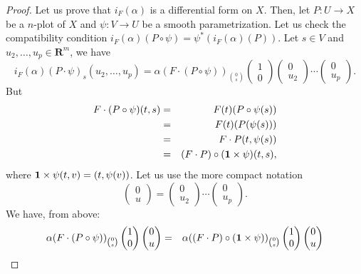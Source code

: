 \documentclass[11pt,reqno]{amsart}
\theoremstyle{definition}
\newcommand{\RR}{{\mathbf R}}
\def \F{{F}}
\def \P{{P}}
\def \U{{U}}
\def \V{{V}}
\def \X{{X}}
\newcommand{\id}{{\bf 1}}
\begin{document}
  \begin{proof}
    Let us prove that $i_\F(\alpha)$ is a differential form on $\X$.
    Then, let $\P : \U \to \X$ be a $n$-plot of $\X$ and $\psi: \V \to \U$ be
    a smooth parametrization. Let us check the compatibility condition  
    $i_\F(\alpha)(\P \circ \psi) = \psi^*(i_\F(\alpha)(\P))$. 
    Let $s \in
      \V$ and $u_2,\ldots,u_{p} \in \RR^m$, we have
    $$
      i_\F(\alpha)(\P\cdot\psi)_s(u_2,\ldots,u_{p}) =
      \alpha(\F \cdot (\P \circ \psi))_{0 \choose s}
      \begin{pmatrix}1 \\ 0\end{pmatrix} \begin{pmatrix}0 \\ u_2\end{pmatrix} \cdots
      \begin{pmatrix}0 \\ u_{p}\end{pmatrix}.
      $$
    But
    \begin{eqnarray*} \F \cdot(\P
      \circ \psi)(t,s) & = & \F(t)(\P \circ \psi(s))\\ & =
      & \F(t)(\P(\psi(s)))\\ & = & \F \cdot
      \P(t,\psi(s)) \\
      & = & (\F \cdot
      \P) \circ (\id\times\psi)(t,s),
    \end{eqnarray*} 
    where $\id\times\psi(t,v) = 
      (t,\psi(v))$. Let us use the more compact notation
    $$\begin{pmatrix}0 \\ u\end{pmatrix} = \begin{pmatrix}0 \\ u_2\end{pmatrix} 
      \cdots\begin{pmatrix}0 \\ u_{p}\end{pmatrix}.
      $$
    We have, from above: 
    \begin{eqnarray*}
      \alpha(\F \cdot
      (\P \circ \psi))_{0 \choose s} 
      \begin{pmatrix}1 \\ 0\end{pmatrix} \begin{pmatrix}0 \\ u\end{pmatrix} &
      = & \alpha((\F \cdot \P) \circ (\id\times\psi))_{0 \choose s} 
      \begin{pmatrix}1 \\ 0\end{pmatrix} \begin{pmatrix}0 \\ u\end{pmatrix} \\ 

\end{eqnarray*}
\end{proof}
\end{document}
